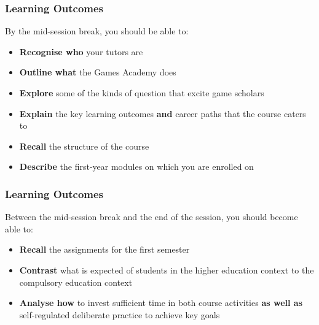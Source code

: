 \usepackage{../../beamerthemeFalmouthGamesAcademy}
\usepackage{multimedia}
\graphicspath{ {../../} }


\usepackage[normalem]{ulem}
\usepackage{wasysym}

\usepackage{pdfpages}

\usetikzlibrary{arrows,automata}







\title{\sessionnumber}
\subtitle{\modulecode: \moduletitle}

\frame{\titlepage} 

\begin{frame}
	\frametitle{Learning Outcomes}
	
	By the mid-session break, you should be able to:
	
	\begin{itemize}
		\item \textbf{Recognise who} your tutors are
		\item \textbf{Outline what} the Games Academy does
		\item \textbf{Explore} some of the kinds of question that excite game scholars
		\item \textbf{Explain} the key learning outcomes \textbf{and} career paths that the course caters to
		\item \textbf{Recall} the structure of the course
		\item \textbf{Describe} the first-year modules on which you are enrolled on
	\end{itemize}
\end{frame}

\begin{frame}
	\frametitle{Learning Outcomes}
	
	Between the mid-session break and the end of the session, you should become able to:
	
	\begin{itemize}
		\item \textbf{Recall} the assignments for the first semester
		\item \textbf{Contrast} what is expected of students in the higher education context to the compulsory education context
		\item \textbf{Analyse how} to invest sufficient time in both course activities \textbf{as well as} self-regulated deliberate practice to achieve key goals
	\end{itemize}
\end{frame}

